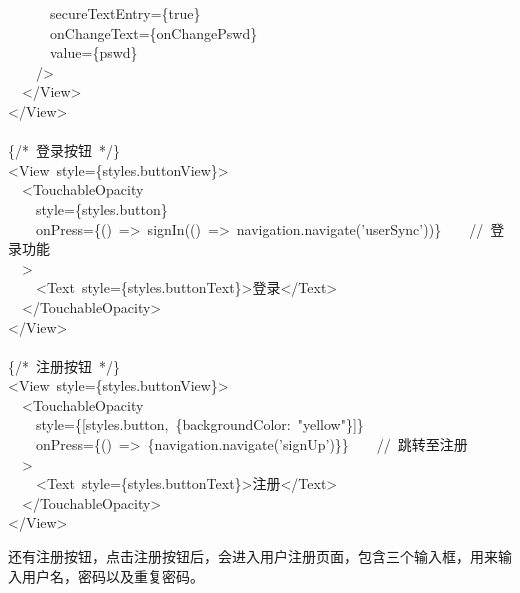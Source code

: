 \documentclass{article}
\begin{document}
\begin{mdpre}
~~~~~~secureTextEntry=\{{true}\}\\
~~~~~~onChangeText=\{onChangePswd\}\\
~~~~~~value=\{pswd\}\\
~~~~/\textgreater{}\\
~~\textless{}/View\textgreater{}\\
\textless{}/View\textgreater{}\\
\\
\{{/*}{~登录按钮~}{*/}\}\\
\textless{}View~style=\{styles.buttonView\}\textgreater{}\\
~~\textless{}TouchableOpacity\\
~~~~style=\{styles.button\}\\
~~~~onPress=\{()~=\textgreater{}~signIn(()~=\textgreater{}~navigation.navigate({'}{userSync}{'}))\}~~~~{//~登录功能}\\
~~\textgreater{}\\
~~~~\textless{}Text~style=\{styles.buttonText\}\textgreater{}登录\textless{}/Text\textgreater{}\\
~~\textless{}/TouchableOpacity\textgreater{}\\
\textless{}/View\textgreater{}\\
\\
\{{/*}{~注册按钮~}{*/}\}\\
\textless{}View~style=\{styles.buttonView\}\textgreater{}\\
~~\textless{}TouchableOpacity\\
~~~~style=\{{}[styles.button,~\{backgroundColor:~{"}{yellow}{"}\}]\}\\
~~~~onPress=\{()~=\textgreater{}~\{navigation.navigate({'}{signUp}{'})\}\}~~~~{//~跳转至注册}\\
~~\textgreater{}\\
~~~~\textless{}Text~style=\{styles.buttonText\}\textgreater{}注册\textless{}/Text\textgreater{}\\
~~\textless{}/TouchableOpacity\textgreater{}\\
\textless{}/View\textgreater{}%
\end{mdpre}\noindent{}还有注册按钮，点击注册按钮后，会进入用户注册页面，包含三个输入框，用来输入用户名，密码以及重复密码。
\end{document}
